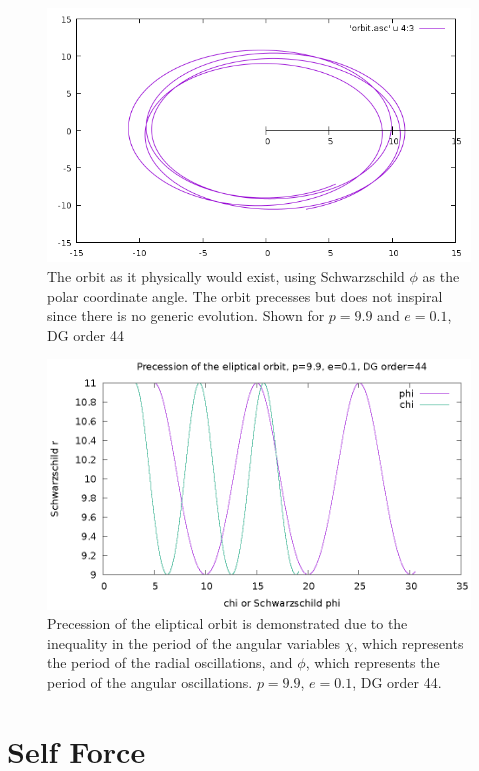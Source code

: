 \begin{figure}
  \includegraphics{orbitevolvedg44p99e01}
  \caption{The orbit as it physically would exist, using Schwarzschild $\phi$ as the polar coordinate angle. The orbit precesses but does not inspiral since there is no generic evolution. Shown for $p=9.9$ and $e=0.1$, DG order 44}
\end{figure}


\begin{figure}
  \includegraphics{precessiondg44p99e01}
  \caption{Precession of the eliptical orbit is demonstrated due to the inequality in the period of the angular variables $\chi$, which represents the period of the radial oscillations, and $\phi$, which represents the period of the angular oscillations. $p=9.9$, $e=0.1$, DG order 44.}
\end{figure}

\section{Self Force}

